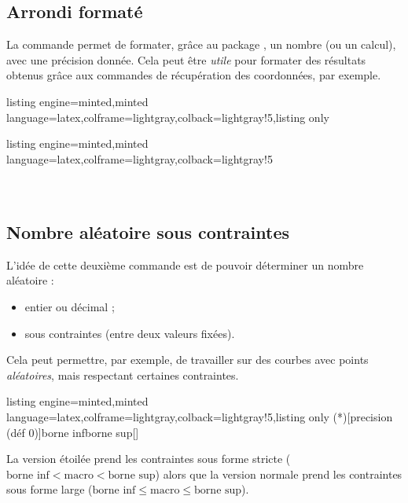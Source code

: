 \documentclass[11pt,a4paper]{ltxdoc}
\begin{document}
\subsection{Arrondi formaté}\label{numarrond}

La commande  permet de formater, grâce au package , un nombre (ou un calcul), avec une précision donnée. Cela peut être \textit{utile} pour formater des résultats obtenus grâce aux commandes de récupération des coordonnées, par exemple.

\begin{tcblisting}{listing engine=minted,minted language=latex,colframe=lightgray,colback=lightgray!5,listing only}
\end{tcblisting}

\begin{tcblisting}{listing engine=minted,minted language=latex,colframe=lightgray,colback=lightgray!5}
\\
\\
\\
\end{tcblisting}

\subsection{Nombre aléatoire sous contraintes}\label{nbalea}

L'idée de cette deuxième commande est de pouvoir déterminer un nombre aléatoire :

\begin{itemize}
	\item entier ou décimal ;
	\item sous contraintes (entre deux valeurs fixées).
\end{itemize}

Cela peut permettre, par exemple, de travailler sur des courbes avec points \textit{aléatoires}, mais respectant certaines contraintes.

\begin{tcblisting}{listing engine=minted,minted language=latex,colframe=lightgray,colback=lightgray!5,listing only}
\ChoisirNbAlea(*)[precision (déf 0)]{borne inf}{borne sup}[\macro]
\end{tcblisting}

La version étoilée prend les contraintes sous forme stricte ($\text{borne inf} < \text{macro} < \text{borne sup}$) alors que la version normale prend les contraintes sous forme large ($\text{borne inf} \leqslant \text{macro} \leqslant \text{borne sup}$).
\end{document}
